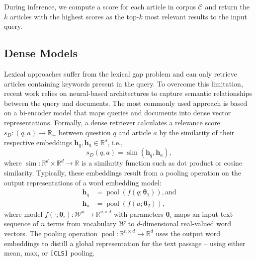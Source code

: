 \documentclass[11pt]{article}
\begin{document}
During inference, we compute a score for each article in corpus $\mathcal{C}$ and return the $k$ articles with the highest scores as the top-$k$ most relevant results to the input query.


\subsection{Dense Models}
Lexical approaches suffer from the lexical gap problem \citep{berger2000bridging} and can only retrieve articles containing keywords present in the query. To overcome this limitation, recent work \citep{lee2019latent, karpukhin2020dense,xiong2021approximate} relies on neural-based architectures to capture semantic relationships between the query and documents. The most commonly used approach is based on a bi-encoder model \citep{gillick2018end} that maps queries and documents into dense vector representations. Formally, a dense retriever calculates a relevance score $s_D: (q,a) \rightarrow \mathbb{R}_+$ between question $q$ and article $a$ by the similarity of their respective embeddings $\boldsymbol{h}_q, \boldsymbol{h}_a \in \mathbb{R}^d$, i.e.,
\begin{equation}
    s_D(q,a) = \operatorname{sim}\left(\boldsymbol{h}_q, \boldsymbol{h}_a\right),
\end{equation}
where $\operatorname{sim}: \mathbb{R}^d \times \mathbb{R}^d \rightarrow \mathbb{R}$ is a similarity function such as dot product or cosine similarity. Typically, these embeddings result from a pooling operation on the output representations of a word embedding model:
\begin{equation}
\begin{split}
    \boldsymbol{h}_{q} &= \operatorname{pool}\left(f(q;\boldsymbol{\theta}_1)\right), \text{and}\\
    \boldsymbol{h}_a &= \operatorname{pool}\left(f(a;\boldsymbol{\theta}_2)\right),
\end{split}
\end{equation}
where model $f(\cdot; \boldsymbol{\theta}_i): \mathcal{W}^{n} \rightarrow \mathbb{R}^{n \times d}$ with parameters $\boldsymbol{\theta}_i$ maps an input text sequence of $n$ terms from vocabulary $\mathcal{W}$ to $d$-dimensional real-valued word vectors. The pooling operation $\operatorname{pool}: \mathbb{R}^{n \times d} \rightarrow \mathbb{R}^{d}$ uses the output word embeddings to distill a global representation for the text passage -- using either mean, max, or \texttt{[CLS]} pooling. 
\end{document}
